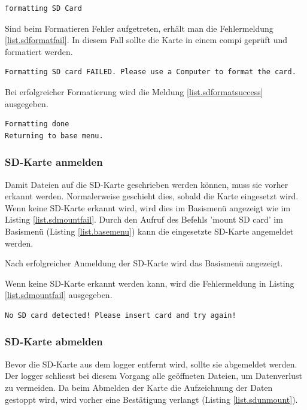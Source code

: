 \begin{lstlisting}[caption=Statusmeldung SD formatieren, label=list.sdformatting]
formatting SD Card
\end{lstlisting}

Sind beim Formatieren Fehler aufgetreten, erhält man die Fehlermeldung \ref{list.sdformatfail}. In diesem Fall sollte die Karte in einem \gls{compi} geprüft und formatiert werden.

\begin{lstlisting}[caption=Fehlermeldung SD formatieren, label=list.sdformatfail]
Formatting SD card FAILED. Please use a Computer to format the card.
\end{lstlisting}

Bei erfolgreicher Formatierung wird die Meldung \ref{list.sdformatsuccess} ausgegeben. 

\begin{lstlisting}[caption=Erfolgsmeldung SD formatieren, label=list.sdformatsuccess]
Formatting done
Returning to base menu.
\end{lstlisting}


\subsubsection{SD-Karte anmelden}\label{sssec.sdmount}
Damit Dateien auf die SD-Karte geschrieben werden können, muss sie vorher erkannt werden. Normalerweise geschieht dies, sobald die Karte eingesetzt wird. Wenn keine SD-Karte erkannt wird, wird dies im Basismenü angezeigt wie im Listing \ref{list.sdmountfail}. Durch den Aufruf des Befehls 'mount SD card' im Basismenü (Listing \ref{list.basemenu}) kann die eingesetzte SD-Karte angemeldet werden.

Nach erfolgreicher Anmeldung der SD-Karte wird das Basismenü angezeigt. 

Wenn keine SD-Karte erkannt werden kann, wird die Fehlermeldung in Listing \ref{list.sdmountfail} ausgegeben.

\begin{lstlisting}[caption=Fehlermeldung SD-Karte anmelden, label=list.sdmountfail]
No SD card detected! Please insert card and try again!
\end{lstlisting}


\subsubsection{SD-Karte abmelden}\label{sssec.sdunmount}
Bevor die SD-Karte aus dem \gls{logger} entfernt wird, sollte sie abgemeldet werden. Der \gls{logger} schliesst bei diesem Vorgang alle geöffneten Dateien, um Datenverlust zu vermeiden. Da beim Abmelden der Karte die Aufzeichnung der Daten gestoppt wird, wird vorher eine Bestätigung verlangt (Listing \ref{list.sdunmount}).

